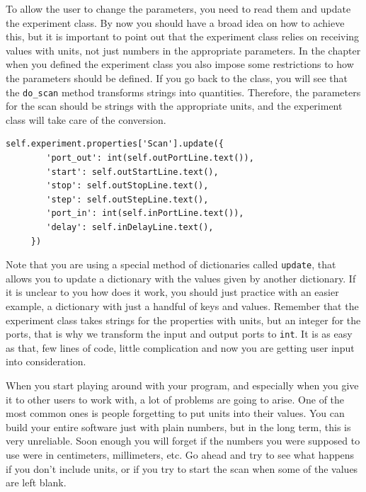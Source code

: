 
To allow the user to change the parameters, you need to read them and
update the experiment class. By now you should have a broad idea on how
to achieve this, but it is important to point out that the experiment
class relies on receiving values with units, not just numbers in the
appropriate parameters. In the chapter when you defined the experiment
class you also impose some restrictions to how the parameters should be
defined. If you go back to the class, you will see that the
\texttt{do_scan} method transforms strings into quantities. Therefore,
the parameters for the scan should be strings with the appropriate
units, and the experiment class will take care of the conversion.

\begin{verbatim}
self.experiment.properties['Scan'].update({
        'port_out': int(self.outPortLine.text()),
        'start': self.outStartLine.text(),
        'stop': self.outStopLine.text(),
        'step': self.outStepLine.text(),
        'port_in': int(self.inPortLine.text()),
        'delay': self.inDelayLine.text(),
     })
\end{verbatim}

Note that you are using a special method of dictionaries called
\texttt{update}, that allows you to update a dictionary with the values
given by another dictionary. If it is unclear to you how does it work,
you should just practice with an easier example, a dictionary with just
a handful of keys and values. Remember that the experiment class takes
strings for the properties with units, but an integer for the ports,
that is why we transform the input and output ports to \texttt{int}. It
is as easy as that, few lines of code, little complication and now you
are getting user input into consideration.

When you start playing around with your program, and especially when you
give it to other users to work with, a lot of problems are going to
arise. One of the most common ones is people forgetting to put units
into their values. You can build your entire software just with plain
numbers, but in the long term, this is very unreliable. Soon enough you
will forget if the numbers you were supposed to use were in centimeters,
millimeters, etc. Go ahead and try to see what happens if you don't
include units, or if you try to start the scan when some of the values
are left blank.

